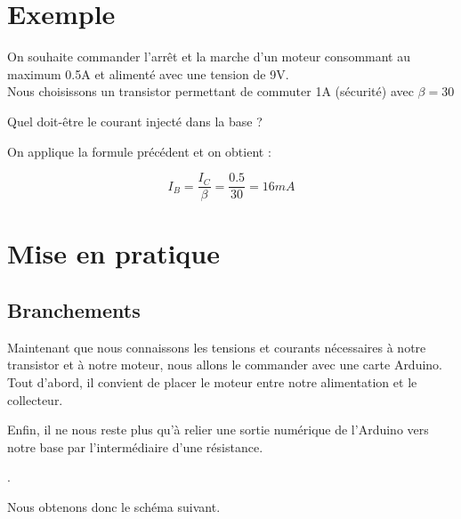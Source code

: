 \section{Exemple}

On souhaite commander l'arrêt et la marche d'un moteur consommant au maximum 0.5A et alimenté avec une tension de 9V. \\
Nous choisissons un transistor permettant de commuter 1A (sécurité) avec $\beta=30$ \\

\begin{question}
Quel doit-être le courant injecté dans la base ?
\end{question}

\begin{reponse}
  On applique la formule précédent et on obtient : 

  $$  I_{B} = \frac{I_{C}}{\beta} = \frac{0.5}{30} = 16 mA $$

  \end{reponse}

 

    \section{Mise en pratique}

    \subsection{Branchements}

    Maintenant que nous connaissons les tensions et courants nécessaires à notre transistor et à notre moteur, nous allons le commander avec une carte Arduino. \\

    Tout d'abord, il convient de placer le moteur entre notre alimentation et le collecteur.\\
    


    Enfin, il ne nous reste plus qu'à relier une sortie numérique de l'Arduino vers notre base par l'intermédiaire d'une résistance.

    .

    Nous obtenons donc le schéma suivant.

